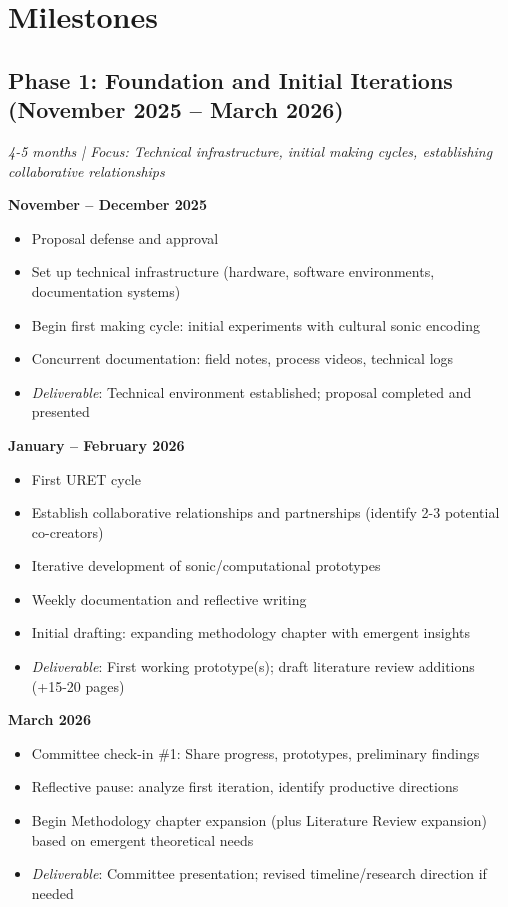 \section{Milestones}

\subsection*{Phase 1: Foundation and Initial Iterations (November 2025 – March 2026)}
\textit{4-5 months | Focus: Technical infrastructure, initial making cycles, establishing collaborative relationships}

\textbf{November – December 2025}
\begin{itemize}[noitemsep]
	\item Proposal defense and approval
	\item Set up technical infrastructure (hardware, software environments, documentation systems)
	\item Begin first making cycle: initial experiments with cultural sonic encoding
	\item Concurrent documentation: field notes, process videos, technical logs
	\item \textit{Deliverable}: Technical environment established; proposal completed and presented
\end{itemize}

\textbf{January – February 2026}
\begin{itemize}[noitemsep]
	\item First URET cycle
	\item Establish collaborative relationships and partnerships (identify 2-3 potential co-creators)
	\item Iterative development of sonic/computational prototypes
	\item Weekly documentation and reflective writing
	\item Initial drafting: expanding methodology chapter with emergent insights
	\item \textit{Deliverable}: First working prototype(s); draft literature review additions (+15-20 pages)
\end{itemize}

\textbf{March 2026}
\begin{itemize}[noitemsep]
	\item Committee check-in \#1: Share progress, prototypes, preliminary findings
	\item Reflective pause: analyze first iteration, identify productive directions
	\item Begin Methodology chapter expansion (plus Literature Review expansion) based on emergent theoretical needs
	\item \textit{Deliverable}: Committee presentation; revised timeline/research direction if needed
\end{itemize}


